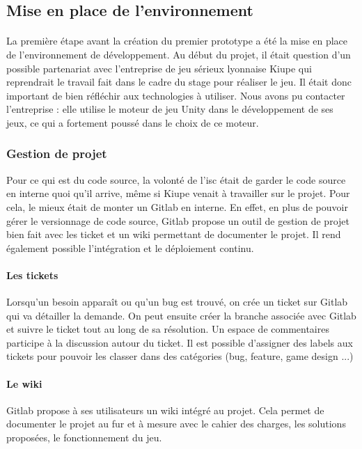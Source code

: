 \subsection{Mise en place de l'environnement}

\paragraph{}La première étape avant la création du premier prototype a été la mise en place de l'environnement de développement. Au début du projet, il était question d'un possible
partenariat avec l'entreprise de jeu sérieux lyonnaise Kiupe qui reprendrait le travail fait dans le cadre du stage pour réaliser le jeu. Il était donc important de bien réfléchir aux
technologies à utiliser. Nous avons pu contacter l'entreprise : elle utilise le moteur de jeu Unity dans le développement de ses jeux, ce qui a fortement poussé dans le choix de ce
moteur.


\subsubsection{Gestion de projet}

Pour ce qui est du code source, la volonté de l'\gls{isc} était de garder le code source en interne quoi qu'il arrive, même si \gls{Kiupe} venait à travailler sur le projet. Pour cela,
le mieux était de monter un Gitlab en interne. En effet, en plus de pouvoir gérer le versionnage de code source, Gitlab propose un outil de gestion de projet bien fait avec les ticket 
et un wiki permettant de documenter le projet. Il rend également possible l'intégration et le déploiement continu.

\paragraph{Les tickets}Lorsqu'un besoin apparaît ou qu'un bug est trouvé, on crée un ticket sur Gitlab qui va détailler la demande. On peut ensuite créer la branche associée avec
Gitlab et suivre le ticket tout au long de sa résolution. Un espace de commentaires participe à la discussion autour du ticket. Il est possible d'assigner des labels aux tickets pour
pouvoir les classer dans des catégories (bug, feature, game design ...)

\paragraph{Le wiki}Gitlab propose à ses utilisateurs un wiki intégré au projet. Cela permet de documenter le projet au fur et à mesure avec le cahier des charges, les solutions
proposées, le fonctionnement du jeu.


